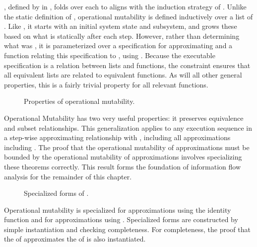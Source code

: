 \Term{\TMmutableExecute}, defined by \COQmutableExecute{} in , folds \COQmutable{} over each \TMop{} to aligns with the induction strategy of \TMmutated{}.
Unlike the static definition of \TMmutable{}, operational mutability is defined inductively over a list of \TMops{}.
Like \COQmutated{}, it starts with an initial system state and subsystem, and grows these based on what is statically \TMmutable{} after each step.
However, rather than determining what was \TMmutated{}, it is parameterized over a specification for approximating \COQdirAccExecute{} and a function relating this specification to \COQdirAccExecute{}, using \COQapproxDirAccDep{}.
Because the executable specification is a relation between \TMop{} lists and functions, the \COQindexed{} constraint ensures that all equivalent lists are related to equivalent functions.
As will all other general properties, this is a fairly trivial property for all relevant functions.


\begin{figure}
  \COQDOCProperMutableExecute{}
  \COQDOCmutableExecuteSubset{}
  \caption{Properties of operational mutability. \label{fig:flow:properMutableExecute}\label{fig:flow:mutatedExecute}}
\end{figure}

Operational Mutability has two very useful properties: it preserves \TMaccessGraph{} equivalence and subset relationships.
This generalization applies to any execution sequence in a step-wise approximating relationship with \COQdirAccExecute{}, including all \TMpotTransfer{} approximations including \COQpotAccExecute{}.
The proof that the operational mutability of \TMdirAcc{} approximations must be bounded by the operational mutability of \TMpotAcc{} approximations involves specializing these theorems correctly.
This result forms the foundation of information flow analysis for the remainder of this chapter.

\begin{figure}
  \COQDOCmutableDirAccExecute
  \COQDOCmutablePotAccExecute
  \COQDOCexistsMutableDirAccExecute
  \COQDOCexistsMutablePotAccExecute
  \COQDOCmutableExecuteDirAccSubsetPotAcc{}
  \caption{Specialized forms of \COQmutableExecute{}. \label{fig:flow:mutableExecuteSpecializations}}
\end{figure}

Operational mutability is specialized for \TMdirAcc{} approximations using the identity function and for \TMpotAcc{} approximations using \COQcomputePotAcc{}.
Specialized forms are constructed by simple instantiation and checking completeness.
For completeness, the proof that the \TMmutability{} of \COQpotAccExecute{} approximates the \TMmutability{} of \COQdirAccExecute{} is also instantiated.

